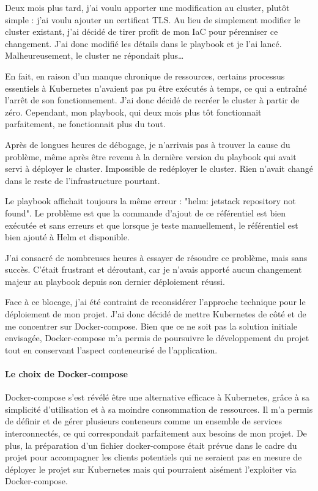 Deux mois plus tard, j'ai voulu apporter une modification au cluster, plutôt simple : j'ai voulu ajouter un certificat TLS.
Au lieu de simplement modifier le cluster existant, j'ai décidé de tirer profit de mon IaC pour pérenniser ce changement.
J'ai donc modifié les détails dans le playbook et je l'ai lancé.
Malheureusement, le cluster ne répondait plus\ldots

En fait, en raison d'un manque chronique de ressources, certains processus essentiels
à Kubernetes n'avaient pas pu être exécutés à temps, ce qui a entraîné l'arrêt de son fonctionnement.
J'ai donc décidé de recréer le cluster à partir de zéro.
Cependant, mon playbook, qui deux mois plus tôt fonctionnait parfaitement, ne fonctionnait plus du tout.

Après de longues heures de débogage, je n'arrivais pas à trouver la cause du problème,
même après être revenu à la dernière version du playbook qui avait servi à déployer le cluster.
Impossible de redéployer le cluster.
Rien n'avait changé dans le reste de l'infrastructure pourtant.

Le playbook affichait toujours la même erreur : "helm: jetstack repository not found". %
Le problème est que la commande d'ajout de ce référentiel est bien exécutée et sans erreurs et que lorsque je teste manuellement,
le référentiel est bien ajouté à Helm et disponible.

J'ai consacré de nombreuses heures à essayer de résoudre ce problème, mais sans succès.
C'était frustrant et déroutant, car je n'avais apporté aucun changement majeur au playbook depuis son dernier déploiement réussi.

Face à ce blocage, j'ai été contraint de reconsidérer l'approche technique pour le déploiement de mon projet.
J'ai donc décidé de mettre Kubernetes de côté et de me concentrer sur Docker-compose.
Bien que ce ne soit pas la solution initiale envisagée,
Docker-compose m'a permis de poursuivre le développement du projet tout en conservant l'aspect conteneurisé de l'application.

\paragraph{Le choix de Docker-compose}


Docker-compose s'est révélé être une alternative efficace à Kubernetes, grâce à sa simplicité d'utilisation et à sa moindre consommation de ressources.
Il m'a permis de définir et de gérer plusieurs conteneurs comme un ensemble de services interconnectés, ce qui correspondait parfaitement aux besoins de mon projet.
De plus, la préparation d'un fichier docker-compose était prévue dans le cadre du projet pour accompagner les clients
potentiels qui ne seraient pas en mesure de déployer le projet sur Kubernetes mais qui pourraient aisément l'exploiter via Docker-compose.

